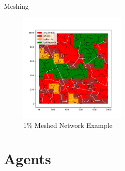 \documentclass[10pt, aspectratio=169]{beamer}
\begin{document}
    \begin{frame}{Meshing}
        \begin{center}
            \begin{figure}
                \centering
                \includegraphics[height=5.5cm, keepaspectratio]{images/meshednetwork.png}
                \caption{1\% Meshed Network Example}
            \end{figure}
        \end{center}
    \end{frame}
    
    \section{Agents}
    
\end{document}
